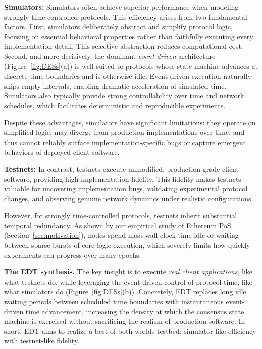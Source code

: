 \noindent\textbf{Simulators:} Simulators often achieve superior performance when modeling strongly time-controlled protocols. This efficiency arises from two fundamental factors.
First, simulators deliberately abstract and simplify protocol logic, focusing on essential behavioral properties rather than faithfully executing every implementation detail. This selective abstraction reduces computational cost.
Second, and more decisively, the dominant \emph{event-driven} architecture (Figure~\ref{fig:DESs}(a)) is well-suited to protocols whose state machine advances at discrete time boundaries and is otherwise idle. Event-driven execution naturally skips empty intervals, enabling dramatic acceleration of simulated time. Simulators also typically provide strong controllability over time and network schedules, which facilitates deterministic and reproducible experiments.

Despite these advantages, simulators have significant limitations: they operate on simplified logic, may diverge from production implementations over time, and thus cannot reliably surface implementation-specific bugs or capture emergent behaviors of deployed client software.

\noindent\textbf{Testnets:} In contrast, testnets execute unmodified, production-grade client software, providing high implementation fidelity. This fidelity makes testnets valuable for uncovering implementation bugs, validating experimental protocol changes, and observing genuine network dynamics under realistic configurations.

However, for strongly time-controlled protocols, testnets inherit substantial temporal redundancy. As shown by our empirical study of Ethereum PoS (Section~\ref{sec:motivation}), nodes spend most wall-clock time idle or waiting between sparse bursts of core-logic execution, which severely limits how quickly experiments can progress over many epochs.

\textbf{The EDT synthesis.} The key insight is to execute \emph{real client applications}, like what testnets do, while leveraging the event-driven control of protocol time, like what simulators do (Figure~\ref{fig:DESs}(b)). Concretely, EDT replaces long idle waiting periods between scheduled time boundaries with instantaneous event-driven time advancement, increasing the density at which the consensus state machine is exercised without sacrificing the realism of production software. In short, EDT aims to realize a best-of-both-worlds testbed: simulator-like efficiency with testnet-like fidelity.

